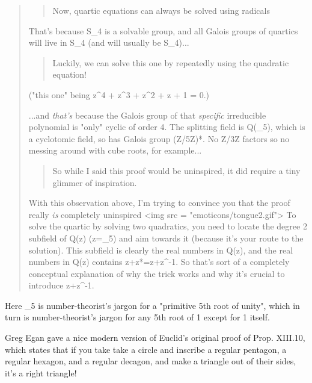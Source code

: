 \begin{quote}

\begin{quote}
    Now, quartic equations can always be solved using radicals
\end{quote}

That's because S_{4} is a solvable group, and all Galois
groups of quartics will live in S_{4} (and will usually be
S_{4})...

\begin{quote}
    Luckily, we can solve this one by repeatedly using the quadratic equation!
\end{quote}

("this one" being z^{4} + z^{3} + z^{2} + z + 1 = 0.)

...and \emph{that's} because the Galois group of that \emph{specific}
irreducible polynomial is "only" cyclic of order 4. The splitting
field is Q(\zeta _{5}), which is a cyclotomic field, so has
Galois group (Z/5Z)*. No Z/3Z factors so no messing around
with cube roots, for example...

\begin{quote}
    So while I said this
    proof would be uninspired, it did require a tiny glimmer of inspiration.
\end{quote}

With this observation above, I'm trying to convince you that the proof
really \emph{is} completely uninspired <img src =
"emoticons/tongue2.gif"> To solve the quartic by solving two
quadratics, you need to locate the degree 2 subfield of Q(z)
(z=\zeta _{5}) and aim towards it (because it's your route to
the solution). This subfield is clearly the real numbers in Q(z), and
the real numbers in Q(z) contains z+z*=z+z^{-1}. So that's sort
of a completely conceptual explanation of why the trick works and why
it's crucial to introduce z+z^{-1}.

\end{quote}

Here \zeta _{5} is number-theorist's jargon for a "primitive
5th root of unity", which in turn is number-theorist's jargon for any 
5th root of 1 except for 1 itself.

Greg Egan gave a nice modern version of Euclid's original 
proof of Prop. XIII.10, which states that if you take
take a circle and inscribe a regular pentagon, a regular hexagon, and 
a regular decagon, and make a triangle out of their sides, it's
a right triangle!

